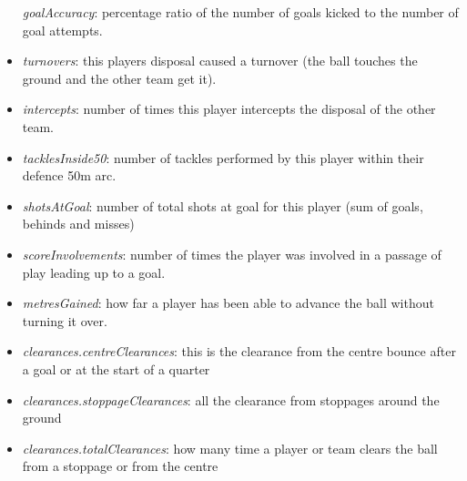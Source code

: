 \begin{itemize}
  \emph{goalAccuracy}: percentage ratio of the number of goals kicked to
  the number of goal attempts.\\
\item
  \emph{turnovers}: this players disposal caused a turnover (the ball
  touches the ground and the other team get it).\\
\item
  \emph{intercepts}: number of times this player intercepts the disposal
  of the other team.
\item
  \emph{tacklesInside50}: number of tackles performed by this player
  within their defence 50m arc.\\
\item
  \emph{shotsAtGoal}: number of total shots at goal for this player (sum
  of goals, behinds and misses)
\item
  \emph{scoreInvolvements}: number of times the player was involved in a
  passage of play leading up to a goal.
\item
  \emph{metresGained}: how far a player has been able to advance the
  ball without turning it over.\\
\item
  \emph{clearances.centreClearances}: this is the clearance from the
  centre bounce after a goal or at the start of a quarter
\item
  \emph{clearances.stoppageClearances}: all the clearance from stoppages
  around the ground
\item
  \emph{clearances.totalClearances}: how many time a player or team
  clears the ball from a stoppage or from the centre
\end{itemize}

\begin{verbatim}
\end{verbatim}



\address{%
Harriet Mason\\
Monash University\\%
Department of Econometrics and Business Statistics\\ Melbourne,
Australia\\
%
\url{https://www.britannica.com/animal/quokka}\\%
\textit{ORCiD: \href{https://orcid.org/0000-1721-1511-1101}{0000-1721-1511-1101}}\\%
\href{mailto:hmas0003@student.monash.edu}{\nolinkurl{hmas0003@student.monash.edu}}%
}

